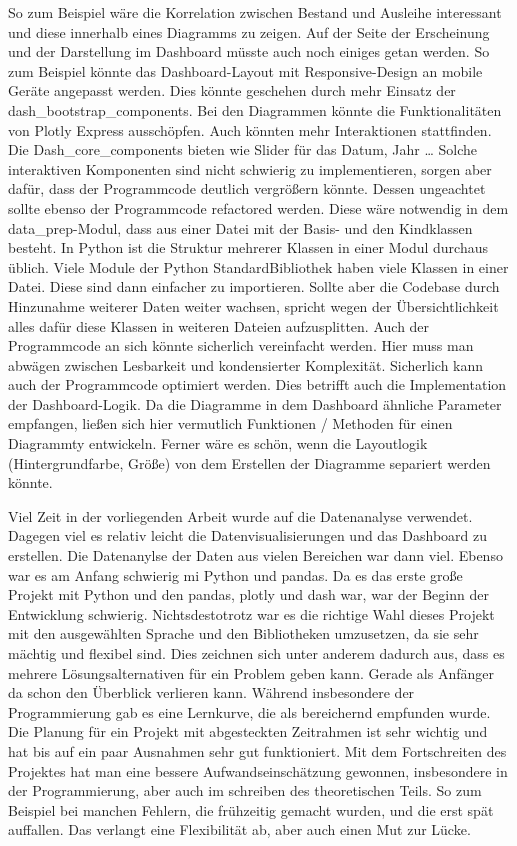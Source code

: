 So zum Beispiel wäre die Korrelation zwischen Bestand und Ausleihe interessant und diese innerhalb eines Diagramms zu zeigen.  
Auf der Seite der Erscheinung und der Darstellung im Dashboard müsste auch noch einiges getan werden. So zum Beispiel könnte das Dashboard-Layout
mit Responsive-Design an mobile Geräte angepasst werden. Dies könnte geschehen durch mehr Einsatz der dash\_bootstrap\_components.
Bei den Diagrammen könnte die Funktionalitäten von Plotly Express ausschöpfen. Auch könnten mehr Interaktionen stattfinden.
Die Dash\_core\_components bieten wie Slider für das Datum, Jahr \dots
Solche interaktiven Komponenten sind nicht schwierig zu implementieren, sorgen aber dafür, dass der Programmcode deutlich vergrößern könnte.
Dessen ungeachtet sollte ebenso der Programmcode refactored werden. Diese wäre notwendig in dem data\_prep-Modul, dass aus einer Datei mit der
Basis- und den Kindklassen besteht. In Python ist die Struktur mehrerer Klassen in einer Modul durchaus üblich. Viele Module der Python StandardBibliothek
haben viele Klassen in einer Datei. Diese sind dann einfacher zu importieren. Sollte aber die Codebase durch Hinzunahme weiterer
Daten weiter wachsen, spricht wegen der Übersichtlichkeit alles dafür diese Klassen in weiteren Dateien aufzusplitten. Auch der Programmcode an sich
könnte sicherlich vereinfacht werden. Hier muss man abwägen zwischen Lesbarkeit und kondensierter Komplexität\cite[Vgl.][]{ousterhout_philosophy_2018}.
Sicherlich kann auch der Programmcode optimiert werden. Dies betrifft auch die Implementation der Dashboard-Logik. Da die Diagramme in dem 
Dashboard ähnliche Parameter empfangen, ließen sich hier vermutlich Funktionen / Methoden für einen Diagrammty entwickeln. Ferner wäre
es schön, wenn die Layoutlogik (Hintergrundfarbe, Größe) von dem Erstellen der Diagramme separiert werden könnte.

Viel Zeit in der vorliegenden Arbeit wurde auf die Datenanalyse verwendet. Dagegen viel es relativ leicht die Datenvisualisierungen und das Dashboard
zu erstellen. Die Datenanylse der Daten aus vielen Bereichen war dann viel. Ebenso war es am Anfang schwierig mi Python und pandas.
Da es das erste große Projekt mit Python und den pandas, plotly und dash war, war der Beginn der Entwicklung schwierig.
Nichtsdestotrotz war es die richtige Wahl dieses Projekt mit den ausgewählten Sprache und den Bibliotheken umzusetzen, da sie sehr mächtig und
flexibel sind. Dies zeichnen sich unter anderem dadurch aus, dass es mehrere Lösungsalternativen für ein Problem geben kann. Gerade als
Anfänger da schon den Überblick verlieren kann. Während insbesondere der Programmierung gab es eine Lernkurve, die als bereichernd empfunden wurde.
Die Planung für ein Projekt mit abgesteckten Zeitrahmen ist sehr wichtig und hat bis auf ein paar Ausnahmen sehr gut funktioniert.
Mit dem Fortschreiten des Projektes hat man eine bessere Aufwandseinschätzung gewonnen, insbesondere in der Programmierung, aber auch im schreiben
des theoretischen Teils. So zum Beispiel bei manchen Fehlern, die frühzeitig gemacht wurden, und die erst spät auffallen. 
Das verlangt eine Flexibilität ab, aber auch einen Mut zur Lücke.

